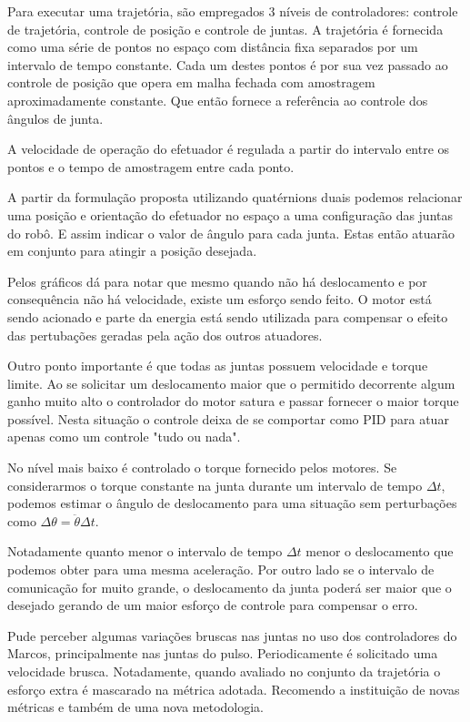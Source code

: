 
Para executar uma trajetória, são empregados 3 níveis de controladores: controle de trajetória, controle de posição e controle de juntas. A trajetória é fornecida como uma série de pontos no espaço com distância fixa separados por um intervalo de tempo constante. Cada um destes pontos é por sua vez passado ao controle de posição que opera em malha fechada com amostragem aproximadamente constante. Que então fornece a referência ao controle dos ângulos de junta.

A velocidade de operação do efetuador é regulada a partir do intervalo entre os pontos e o tempo de amostragem entre cada ponto.

A partir da formulação proposta utilizando quatérnions duais podemos relacionar uma posição e orientação do efetuador no espaço a uma configuração das juntas do robô. E assim indicar o valor de ângulo para cada junta. Estas então atuarão em conjunto para atingir a posição desejada.

Pelos gráficos dá para notar que mesmo quando não há deslocamento e por consequência não há velocidade, existe um esforço sendo feito. O motor está sendo acionado e parte da energia está sendo utilizada para compensar o efeito das pertubações geradas pela ação dos outros atuadores.

Outro ponto importante é que todas as juntas possuem velocidade e torque limite. Ao se solicitar um deslocamento maior que o permitido decorrente algum ganho muito alto o controlador do motor satura e passar fornecer o maior torque possível. Nesta situação o controle deixa de se comportar como PID para atuar apenas como um controle "tudo ou nada".

No nível mais baixo é controlado o torque fornecido pelos motores. Se considerarmos o torque constante na junta durante um intervalo de tempo $\Delta t$, podemos estimar o ângulo de deslocamento para uma situação sem perturbações como $\Delta\theta = \ddot{\theta}\Delta t $.

Notadamente quanto menor o intervalo de tempo $\Delta t$ menor o deslocamento que podemos obter para uma mesma aceleração. Por outro lado se o intervalo de comunicação for muito grande, o deslocamento da junta poderá ser maior que o desejado gerando de um maior esforço de controle para compensar o erro.

Pude perceber algumas variações bruscas nas juntas no uso dos controladores do Marcos, principalmente nas juntas do pulso. Periodicamente é solicitado uma velocidade brusca. Notadamente, quando avaliado no conjunto da trajetória o esforço extra é mascarado na métrica adotada. Recomendo a instituição de novas métricas e também de uma nova metodologia.

